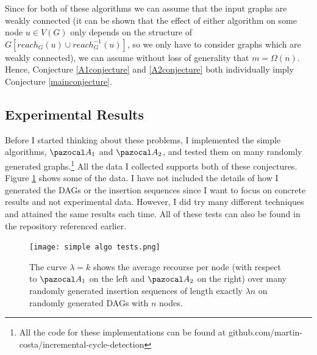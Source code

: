 \documentclass{report}
\begin{document}
Since for both of these algorithms we can assume that the input graphs are weakly connected (it can be shown that the effect of either algorithm on some node $u \in V(G)$ only depends on the structure of $G[reach_G(u) \cup reach^{-1}_G(u)]$, so we only have to consider graphs which are weakly connected), we can assume without loss of generality that $m=\Omega(n)$. Hence, Conjecture \ref{A1conjecture} and \ref{A2conjecture} both individually imply Conjecture \ref{mainconjecture}.

\subsection{Experimental Results}

Before I started thinking about these problems, I implemented the simple algorithms, $\pazocal A_1$ and $\pazocal A_2$, and tested them on many randomly generated graphs.\footnote{All the code for these implementations can be found at github.com/martin-costa/incremental-cycle-detection} All the data I collected supports both of these conjectures. Figure \ref{fig:recoursetests1} shows some of the data. I have not included the details of how I generated the DAGs or the insertion sequences since I want to focus on concrete results and not experimental data. However, I did try many different techniques and attained the same results each time. All of these tests can also be found in the repository referenced earlier.

\begin{figure}[htp]
    \centering
    \centerline{\texttt{[image: simple algo tests.png]}}
    \caption{The curve $\lambda = k$ shows the average recourse per node (with respect to $\pazocal A_1$ on the left and $\pazocal A_2$ on the right) over many randomly generated insertion sequences of length exactly $\lambda n$ on randomly generated DAGs with $n$ nodes.}
    \label{fig:recoursetests1}
\end{figure}
\end{document}
